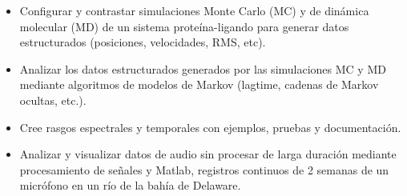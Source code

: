 \documentclass[10pt,letter,ragged2e,withhyper]{altacv}
\begin{document}
\begin{paracol}{2}


\begin{itemize}
\item Configurar y contrastar simulaciones Monte Carlo (MC) y de dinámica molecular (MD) de un sistema proteína-ligando para generar datos estructurados (posiciones, velocidades, RMS, etc).
\item Analizar los datos estructurados generados por las simulaciones MC y MD mediante algoritmos de modelos de Markov (lagtime, cadenas de Markov ocultas, etc.).
\end{itemize}

\divider

\begin{itemize}
\item Cree rasgos espectrales y temporales con ejemplos, pruebas y documentación. 
\end{itemize}


\divider




\begin{itemize}
\item Analizar y visualizar datos de audio sin procesar de larga duración mediante procesamiento de señales y Matlab, registros continuos de 2 semanas de un micrófono en un río de la bahía de Delaware.
\end{itemize}




\end{paracol}
\end{document}
